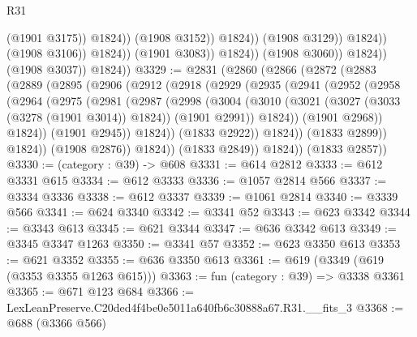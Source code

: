 \begin{lexlean}{R31}
\begin{coremodule}
                                              (@1901 @3175))
                                            @1824))
                                        (@1908 @3152))
                                      @1824))
                                  (@1908 @3129))
                                @1824))
                            (@1908 @3106))
                          @1824))
                      (@1901 @3083))
                    @1824))
                (@1908 @3060))
              @1824))
          (@1908 @3037))
        @1824))
@3329 := @2831
    (@2860
      (@2866
        (@2872
          (@2883
            (@2889
              (@2895
                (@2906
                  (@2912
                    (@2918
                      (@2929
                        (@2935
                          (@2941
                            (@2952
                              (@2958
                                (@2964
                                  (@2975
                                    (@2981
                                      (@2987
                                        (@2998
                                          (@3004
                                            (@3010
                                              (@3021
                                                (@3027 (@3033 (@3278 (@1901 @3014)) @1824))
                                                (@1901 @2991))
                                              @1824))
                                          (@1901 @2968))
                                        @1824))
                                    (@1901 @2945))
                                  @1824))
                              (@1833 @2922))
                            @1824))
                        (@1833 @2899))
                      @1824))
                  (@1908 @2876))
                @1824))
            (@1833 @2849))
          @1824))
      (@1833 @2857))
@3330 := (category : @39) -> @608
@3331 := @614 @2812
@3333 := @612 @3331 @615
@3334 := @612 @3333
@3336 := @1057 @2814 @566
@3337 := @3334 @3336
@3338 := @612 @3337
@3339 := @1061 @2814
@3340 := @3339 @566
@3341 := @624 @3340
@3342 := @3341 @52
@3343 := @623 @3342
@3344 := @3343 @613
@3345 := @621 @3344
@3347 := @636 @3342 @613
@3349 := @3345 @3347 @1263
@3350 := @3341 @57
@3352 := @623 @3350 @613
@3353 := @621 @3352
@3355 := @636 @3350 @613
@3361 := @619 (@3349 (@619 (@3353 @3355 @1263 @615)))
@3363 := fun (category : @39) => @3338 @3361
@3365 := @671 @123 @684
@3366 := LexLeanPreserve.C20ded4f4be0e5011a640fb6c30888a67.R31.__fits_3
@3368 := @688 (@3366 @566)

\end{coremodule}
\end{lexlean}
